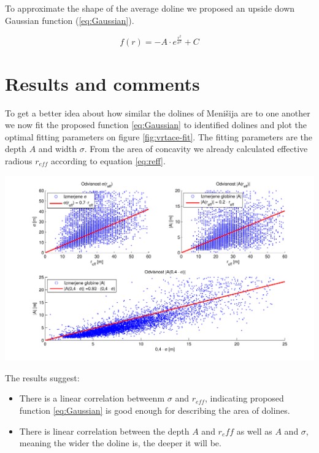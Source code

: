 \documentclass[a0,portrait]{a0poster}
\begin{document}
\begin{multicols}{2}
To approximate the shape of the average doline we proposed an upside down Gaussian function (\ref{eq:Gaussian}).

\begin{equation}
	f(r) = - A \cdot e^{\frac{r^2}{\sigma^2}} + C
	\label{eq:Gaussian}
\end{equation}


\section*{Results and comments}

To get a better idea about how similar the dolines of Menišija are to one another we now fit the proposed function \ref{eq:Gaussian} to identified dolines and plot the optimal fitting parameters on figure \ref{fig:vrtace-fit}. The fitting parameters are the depth $A$ and width $\sigma$. From the area of concavity we already calculated effective radious $r_{eff}$ according to equation \ref{eq:reff}.

\begin{center}
\includegraphics[width=\linewidth]{menisija-A-sigma-reff.pdf}
\label{fig:vrtace-fit}
\end{center}

The results suggest:
\begin{itemize}
	\item There is a linear correlation betweenm $\sigma$ and $r_{eff}$, indicating proposed function \ref{eq:Gaussian} is good enough for describing the area of dolines.
	\item There is linear correlation between the depth $A$ and $r_eff$ as well as $A$ and $\sigma$, meaning the wider the doline is, the deeper it will be.
\end{itemize}



\end{multicols}
\end{document}
